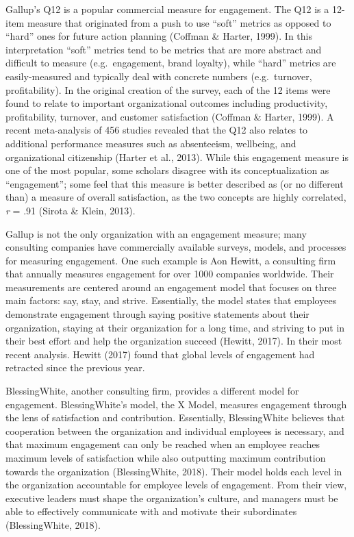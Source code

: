 \documentclass[
  man]{apa6}
\begin{document}
Gallup's Q12 is a popular commercial measure for engagement. The Q12 is a 12-item measure that originated from a push to use ``soft'' metrics as opposed to ``hard'' ones for future action planning (Coffman \& Harter, 1999). In this interpretation ``soft'' metrics tend to be metrics that are more abstract and difficult to measure (e.g.~engagement, brand loyalty), while ``hard'' metrics are easily-measured and typically deal with concrete numbers (e.g.~turnover, profitability). In the original creation of the survey, each of the 12 items were found to relate to important organizational outcomes including productivity, profitability, turnover, and customer satisfaction (Coffman \& Harter, 1999). A recent meta-analysis of 456 studies revealed that the Q12 also relates to additional performance measures such as absenteeism, wellbeing, and organizational citizenship (Harter et al., 2013). While this engagement measure is one of the most popular, some scholars disagree with its conceptualization as ``engagement''; some feel that this measure is better described as (or no different than) a measure of overall satisfaction, as the two concepts are highly correlated, \emph{r} = .91 (Sirota \& Klein, 2013).

Gallup is not the only organization with an engagement measure; many consulting companies have commercially available surveys, models, and processes for measuring engagement. One such example is Aon Hewitt, a consulting firm that annually measures engagement for over 1000 companies worldwide. Their measurements are centered around an engagement model that focuses on three main factors: say, stay, and strive. Essentially, the model states that employees demonstrate engagement through saying positive statements about their organization, staying at their organization for a long time, and striving to put in their best effort and help the organization succeed (Hewitt, 2017). In their most recent analysis. Hewitt (2017) found that global levels of engagement had retracted since the previous year.

BlessingWhite, another consulting firm, provides a different model for engagement. BlessingWhite's model, the X Model, measures engagement through the lens of satisfaction and contribution. Essentially, BlessingWhite believes that cooperation between the organization and individual employees is necessary, and that maximum engagement can only be reached when an employee reaches maximum levels of satisfaction while also outputting maximum contribution towards the organization (BlessingWhite, 2018). Their model holds each level in the organization accountable for employee levels of engagement. From their view, executive leaders must shape the organization's culture, and managers must be able to effectively communicate with and motivate their subordinates (BlessingWhite, 2018).
\end{document}
